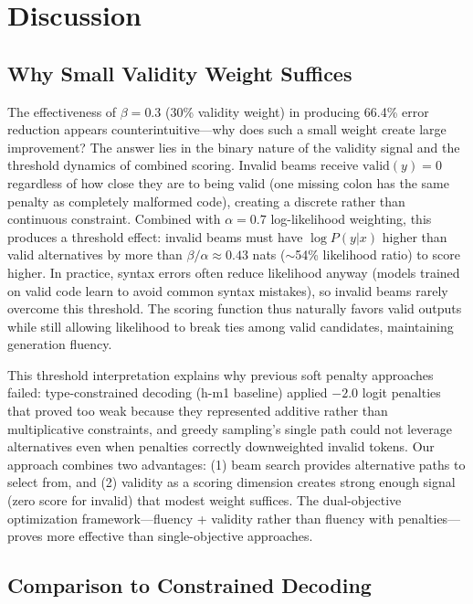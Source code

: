 \section{Discussion}

\subsection{Why Small Validity Weight Suffices}

The effectiveness of $\beta=0.3$ (30\% validity weight) in producing 66.4\% error reduction appears counterintuitive---why does such a small weight create large improvement? The answer lies in the binary nature of the validity signal and the threshold dynamics of combined scoring. Invalid beams receive $\text{valid}(y)=0$ regardless of how close they are to being valid (one missing colon has the same penalty as completely malformed code), creating a discrete rather than continuous constraint. Combined with $\alpha=0.7$ log-likelihood weighting, this produces a threshold effect: invalid beams must have $\log P(y|x)$ higher than valid alternatives by more than $\beta / \alpha \approx 0.43$ nats ($\sim$54\% likelihood ratio) to score higher. In practice, syntax errors often reduce likelihood anyway (models trained on valid code learn to avoid common syntax mistakes), so invalid beams rarely overcome this threshold. The scoring function thus naturally favors valid outputs while still allowing likelihood to break ties among valid candidates, maintaining generation fluency.

This threshold interpretation explains why previous soft penalty approaches failed: type-constrained decoding (h-m1 baseline) applied $-2.0$ logit penalties that proved too weak because they represented additive rather than multiplicative constraints, and greedy sampling's single path could not leverage alternatives even when penalties correctly downweighted invalid tokens. Our approach combines two advantages: (1) beam search provides alternative paths to select from, and (2) validity as a scoring dimension creates strong enough signal (zero score for invalid) that modest weight suffices. The dual-objective optimization framework---fluency + validity rather than fluency with penalties---proves more effective than single-objective approaches.

\subsection{Comparison to Constrained Decoding}

